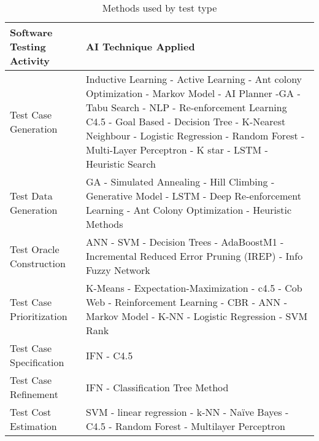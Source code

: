 \documentclass[12pt]{article}
\begin{document}
\begin{table}[]
\begin{tabular}{|p{}|p{}|}
\hline
\textbf{Software Testing Activity} & \textbf{AI Technique Applied}                                                                                                                                                                                                                                                                          \\ \hline
Test Case Generation               & Inductive Learning - Active Learning - Ant colony Optimization - Markov Model - AI Planner -GA - Tabu Search - NLP - Re-enforcement Learning C4.5 - Goal Based - Decision Tree - K-Nearest Neighbour - Logistic Regression - Random Forest - Multi-Layer Perceptron - K star - LSTM - Heuristic Search \\ \hline
Test Data Generation               & GA - Simulated Annealing - Hill Climbing - Generative Model - LSTM - Deep Re-enforcement Learning - Ant Colony Optimization - Heuristic Methods                                                                                                                                                        \\ \hline
Test Oracle Construction           & ANN - SVM - Decision Trees - AdaBoostM1 - Incremental Reduced Error Pruning (IREP) - Info Fuzzy Network                                                                                                                                                                                                \\ \hline
Test Case Prioritization           & K-Means - Expectation-Maximization - c4.5 - Cob Web - Reinforcement Learning - CBR - ANN - Markov Model - K-NN - Logistic Regression - SVM Rank                                                                                                                                                        \\ \hline
Test Case Specification            & IFN - C4.5                                                                                                                                                                                                                                                                                             \\ \hline
Test Case Refinement               & IFN - Classification Tree Method                                                                                                                                                                                                                                                                       \\ \hline
Test Cost Estimation               & SVM - linear regression - k-NN - Naïve Bayes - C4.5 - Random Forest - Multilayer Perceptron                                                                                                                                                                                                            \\ \hline
\end{tabular}
\caption{Methods used by test type}
\end{table}
\end{document}
